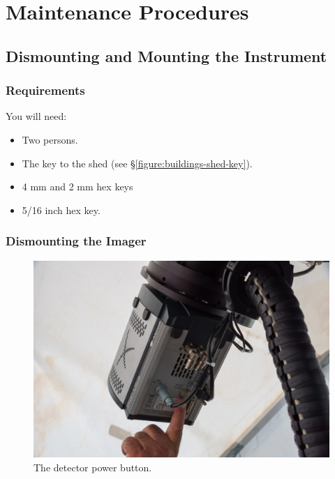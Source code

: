 \section{Maintenance Procedures}

\subsection{Dismounting and Mounting the Instrument}
\label{section:huitzi-dismounting-and-mounting}

\subsubsection{Requirements}

You will need:

\begin{itemize}
    \item Two persons.
    \item The key to the shed (see \S\ref{figure:buildings-shed-key}).
    \item 4 mm and 2 mm hex keys
    \item 5/16 inch hex key.
\end{itemize}

\subsubsection{Dismounting the Imager}

\begin{figure}
\begin{center}
\includegraphics[width=0.8\linewidth]{figures/huitzi-detector-power-button.jpg}
\end{center}
\caption{The detector power button.}
\label{figure:huitzi-detector-power-button}
\end{figure}

